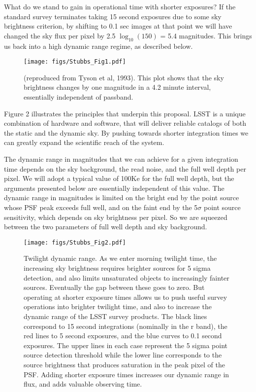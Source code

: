 What do we stand to gain in operational time with shorter exposures? If the standard survey terminates taking 15 second exposures due to some sky brightness criterion, by shifting to 0.1 sec images at that point we will have changed the sky flux per pixel by 2.5 $\log_{10}(150)$ = 5.4 magnitudes. This brings us back into a high dynamic range regime, as described below. 

\begin{figure}[htbp]
\begin{center}
\texttt{[image: figs/Stubbs\_Fig1.pdf]}
\caption{(reproduced from Tyson et al, 1993). This plot shows that the sky brightness changes by one magnitude in a 4.2 minute interval, essentially independent of passband.}
\label{fig:Tyson}
\end{center}
\end{figure}

Figure 2 illustrates the principles that underpin this proposal. LSST is a unique combination of hardware and software, that will deliver reliable catalogs of both the static and the dynamic sky. By pushing towards shorter integration times we can greatly expand the scientific reach of the system. 

The dynamic range in magnitudes that we can achieve for a given integration time depends on the sky background, the read noise, and the full well depth per pixel. We will adopt a typical value of 100Ke for the full well depth, but the arguments presented below are essentially independent of this value. The dynamic range in magnitudes is limited on the bright end by the point source whose PSF peak exceeds full well, and on the faint end by the 5$\sigma$ point source sensitivity, which depends on sky brightness per pixel. So we are squeezed between the two parameters of full well depth and sky background. 

\begin{figure}[htbp]
\begin{center}
\texttt{[image: figs/Stubbs\_Fig2.pdf]}
\caption{Twilight dynamic range. As we enter morning twilight time, the increasing sky brightness requires brighter sources for 5 sigma detection, and also limits unsaturated objects to increasingly fainter sources. Eventually the gap between these goes to zero. But operating at shorter exposure times allows us to push useful survey operations into brighter twilight time, and also to increase the dynamic range of the LSST survey products. The black lines correspond to 15 second integrations (nominally in the r band), the red lines to 5 second exposures, and the blue curves to 0.1 second exposures. The upper lines in each case represent the 5 sigma point source detection threshold while the lower line corresponds to the source brightness that produces saturation in the peak pixel of the PSF. Adding shorter exposure times increases our dynamic range in flux, and adds valuable observing time.}
\label{fig:twilight}
\end{center}
\end{figure}

